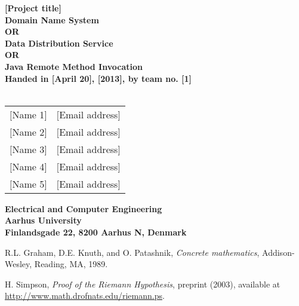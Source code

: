 \documentclass[a4paper,10pt]{report}
\begin{document}
\begin{titlepage}
\begin{center}
{\LARGE \textbf{[Project title]}}\\
{\large \textbf{Domain Name System\\ OR\\ Data Distribution Service\\ OR\\ Java Remote Method Invocation}}\\


\vspace{4cm}
\textbf{Handed in [April 20], [2013], by team no. [1]}\\~\\
\begin{tabular}{ll}
$[$Name 1$]$  & $[$Email address$]$ \\
$[$Name 2$]$  & $[$Email address$]$ \\
$[$Name 3$]$  & $[$Email address$]$ \\
$[$Name 4$]$  & $[$Email address$]$ \\
$[$Name 5$]$  & $[$Email address$]$ \\
\end{tabular}
\vfill
\textbf{Electrical and Computer Engineering}\\
\textbf{Aarhus University}\\
\textbf{Finlandsgade 22, 8200 Aarhus N, Denmark}
\end{center}
\end{titlepage}












\begin{thebibliography}{9}

R.L. Graham, D.E. Knuth, and O. Patashnik, \emph{Concrete
mathematics}, Addison-Wesley, Reading, MA, 1989.

 H. Simpson, \emph{Proof of the Riemann
Hypothesis},  preprint (2003), available at 
\url{http://www.math.drofnats.edu/riemann.ps}.

\end{thebibliography}
\end{document}
